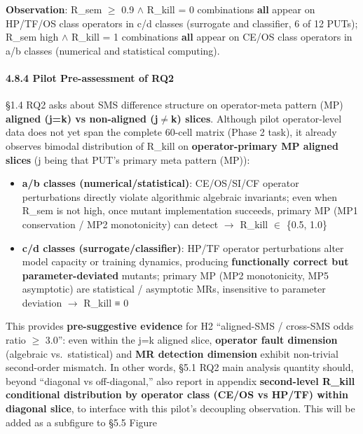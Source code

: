 \documentclass[review,12pt,authoryear]{elsarticle}
\providecommand{\tightlist}{\setlength{\itemsep}{0pt}\setlength{\parskip}{0pt}}
\begin{document}
\textbf{Observation}: R\_sem $\geq$ 0.9 $\wedge$ R\_kill = 0 combinations
\textbf{all} appear on HP/TF/OS class operators in c/d classes
(surrogate and classifier, 6 of 12 PUTs); R\_sem high $\wedge$ R\_kill = 1
combinations \textbf{all} appear on CE/OS class operators in a/b classes
(numerical and statistical computing).

\paragraph{4.8.4 Pilot Pre-assessment of
RQ2}\label{pilot-pre-assessment-of-rq2}

§1.4 RQ2 asks about SMS difference structure on operator-meta pattern
(MP) \textbf{aligned (j=k) vs non-aligned (j$\neq$k) slices}. Although pilot
operator-level data does not yet span the complete 60-cell matrix (Phase
2 task), it already observes bimodal distribution of R\_kill on
\textbf{operator-primary MP aligned slices} (j being that PUT's primary
meta pattern (MP)):

\begin{itemize}
\tightlist
\item
  \textbf{a/b classes (numerical/statistical)}: CE/OS/SI/CF operator
  perturbations directly violate algorithmic algebraic invariants; even
  when R\_sem is not high, once mutant implementation succeeds, primary
  MP (MP1 conservation / MP2 monotonicity) can detect $\to$ R\_kill $\in$ \{0.5,
  1.0\}
\item
  \textbf{c/d classes (surrogate/classifier)}: HP/TF operator
  perturbations alter model capacity or training dynamics, producing
  \textbf{functionally correct but parameter-deviated} mutants; primary
  MP (MP2 monotonicity, MP5 asymptotic) are statistical / asymptotic
  MRs, insensitive to parameter deviation $\to$ R\_kill ≡ 0
\end{itemize}

This provides \textbf{pre-suggestive evidence} for H2 ``aligned-SMS /
cross-SMS odds ratio $\geq$ 3.0'': even within the j=k aligned slice,
\textbf{operator fault dimension} (algebraic vs.~statistical) and
\textbf{MR detection dimension} exhibit non-trivial second-order
mismatch. In other words, §5.1 RQ2 main analysis quantity should, beyond
``diagonal vs off-diagonal,'' also report in appendix
\textbf{second-level R\_kill conditional distribution by operator class
(CE/OS vs HP/TF) within diagonal slice}, to interface with this pilot's
decoupling observation. This will be added as a subfigure to §5.5 Figure
\end{document}
